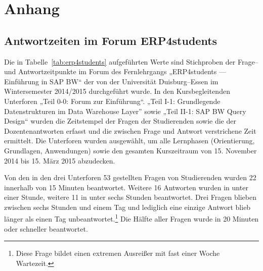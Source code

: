 \appendix
\section{Anhang} %
\label{sec:anhang}

\subsection{Antwortzeiten im Forum ERP4students} %
\label{sub:antwortzeiten_im_forum_erp4students}
Die in Tabelle~\ref{tab:erp4students} aufgeführten Werte sind Stichproben der Frage– und Antwortzeitpunkte im Forum des Fernlehrgangs „ERP4students — Einführung in SAP BW“ der von der Universität Duisburg–Essen im Wintersemester 2014/2015 durchgeführt wurde. In den Kursbegleitenden Unterforen „Teil 0-0: Forum zur Einführung“. „Teil I-1: Grundlegende Datenstrukturen im Data Warehouse Layer” sowie „Teil II-1: SAP BW Query Design“ wurden die Zeitstempel der Fragen der Studierenden sowie die der Dozentenantworten erfasst und die zwischen Frage und Antwort verstrichene Zeit ermittelt. Die Unterforen wurden ausgewählt, um alle Lernphasen (Orientierung, Grundlagen, Anwendungen) sowie den gesamten Kurszeitraum von 15. November 2014 bis 15. März 2015 abzudecken.

Von den in den drei Unterforen 53 gestellten Fragen von Studierenden wurden 22 innerhalb von 15 Minuten beantwortet. Weitere 16 Antworten wurden in unter einer Stunde, weitere 11 in unter sechs Stunden beantwortet. Drei Fragen blieben zwischen sechs Stunden und einem Tag und lediglich eine einzige Antwort blieb länger als einen Tag unbeantwortet.\footnote{Diese Frage bildet einen extremen Ausreißer mit fast einer Woche Wartezeit.} Die Hälfte aller Fragen wurde in 20 Minuten oder schneller beantwortet.

